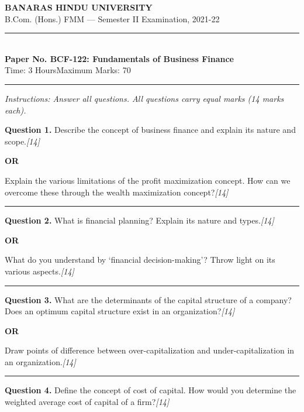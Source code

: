 \documentclass[11pt,a4paper]{article}
\newcommand{\pts}[1]{\hfill   \textit{[#1]}}
\begin{document}
\begin{center}
  {\large\bfseries BANARAS HINDU UNIVERSITY}\\[2pt]
  {\normalsize B.Com. (Hons.) FMM --- Semester II Examination, 2021-22}\\[6pt]
  \rule{0.8\linewidth}{0.5pt}\\[6pt]
  {\large\bfseries Paper No. BCF-122: Fundamentals of Business Finance}\\[4pt]
  {\normalsize Time: 3 Hours\hfill Maximum Marks: 70}
\end{center}

\rule{\linewidth}{0.4pt}

\smallskip



\noindent   \textit{Instructions: Answer all questions. All questions carry equal marks (14 marks each).}

\bigskip




\noindent   \textbf{Question 1.}
Describe the concept of business finance and explain its nature and scope.\pts{14}

\centerline{   \textbf{OR}}

Explain the various limitations of the profit maximization concept. How can we overcome these through the wealth maximization concept?\pts{14}

\medskip\rule{\linewidth}{0.2pt}




\noindent   \textbf{Question 2.}
What is financial planning? Explain its nature and types.\pts{14}

\centerline{   \textbf{OR}}

What do you understand by `financial decision-making'? Throw light on its various aspects.\pts{14}

\medskip\rule{\linewidth}{0.2pt}




\noindent   \textbf{Question 3.}
What are the determinants of the capital structure of a company? Does an optimum capital structure exist in an organization?\pts{14}

\centerline{   \textbf{OR}}

Draw points of difference between over-capitalization and under-capitalization in an organization.\pts{14}

\medskip\rule{\linewidth}{0.2pt}




\noindent   \textbf{Question 4.}
Define the concept of cost of capital. How would you determine the weighted average cost of capital of a firm?\pts{14}
\end{document}
